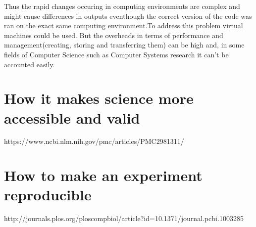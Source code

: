 Thus the rapid changes occuring in computing environments are complex and might cause differences in outputs eventhough the correct version of the code was ran on the exact same computing environment.To address this problem virtual machines could be used. But the overheads in terms of performance and management(creating, storing and transferring them) can be high and, in some fields of Computer Science such as Computer Systems research it can't be accounted easily.\cite{7092948}

\section{How it makes science more accessible and valid}
https://www.ncbi.nlm.nih.gov/pmc/articles/PMC2981311/
\section{How to make an experiment reproducible}
http://journals.plos.org/ploscompbiol/article?id=10.1371/journal.pcbi.1003285

